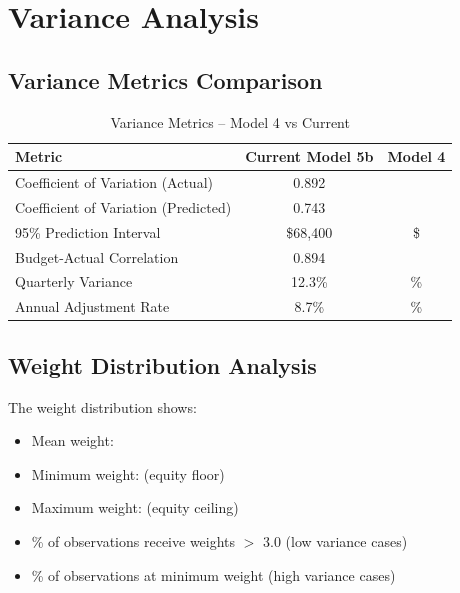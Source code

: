 \section{Variance Analysis}

\subsection{Variance Metrics Comparison}

\begin{table}[h]
\centering
\caption{Variance Metrics -- Model 4 vs Current}
\begin{tabular}{lcc}
\toprule
\textbf{Metric} & \textbf{Current Model 5b} & \textbf{Model 4} \\
\midrule
Coefficient of Variation (Actual) & 0.892 & \ModelFourCVActual{} \\
Coefficient of Variation (Predicted) & 0.743 & \ModelFourCVPredicted{} \\
95\% Prediction Interval & \$68,400 & \$\ModelFourPredictionInterval{} \\
Budget-Actual Correlation & 0.894 & \ModelFourBudgetActualCorr{} \\
Quarterly Variance & 12.3\% & \ModelFourQuarterlyVariance{}\% \\
Annual Adjustment Rate & 8.7\% & \ModelFourAnnualAdjustmentRate{}\% \\
\bottomrule
\end{tabular}
\end{table}

\subsection{Weight Distribution Analysis}

The weight distribution shows:
\begin{itemize}
    \item Mean weight: \ModelFourWeightMean{}
    \item Minimum weight: \ModelFourWeightMin{} (equity floor)
    \item Maximum weight: \ModelFourWeightMax{} (equity ceiling)
    \item \ModelFourWeightAboveThreePct{}\% of observations receive weights $>$ 3.0 (low variance cases)
    \item \ModelFourWeightAtMinPct{}\% of observations at minimum weight (high variance cases)
\end{itemize}

